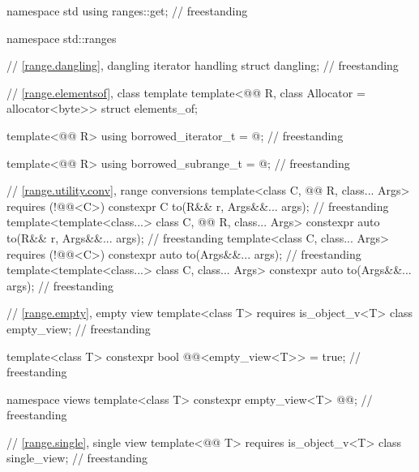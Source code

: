 \begin{codeblock}
namespace std {
  using ranges::get;                                                                // freestanding
}

namespace std::ranges {
  // \ref{range.dangling}, dangling iterator handling
  struct dangling;                                                                  // freestanding

  // \ref{range.elementsof}, class template 
  template<@@ R, class Allocator = allocator<byte>>
    struct elements_of;

  template<@@ R>
    using borrowed_iterator_t = @\seebelow@;                                          // freestanding

  template<@@ R>
    using borrowed_subrange_t = @\seebelow@;                                          // freestanding

  // \ref{range.utility.conv}, range conversions
  template<class C, @@ R, class... Args> requires (!@@<C>)
    constexpr C to(R&& r, Args&&... args);                                          // freestanding
  template<template<class...> class C, @@ R, class... Args>
    constexpr auto to(R&& r, Args&&... args);                                       // freestanding
  template<class C, class... Args> requires (!@@<C>)
    constexpr auto to(Args&&... args);                                              // freestanding
  template<template<class...> class C, class... Args>
    constexpr auto to(Args&&... args);                                              // freestanding

  // \ref{range.empty}, empty view
  template<class T>
    requires is_object_v<T>
  class empty_view;                                                                 // freestanding

  template<class T>
    constexpr bool @@<empty_view<T>> = true;                     // freestanding

  namespace views {
    template<class T>
      constexpr empty_view<T> @@{};                                              // freestanding
  }

  // \ref{range.single}, single view
  template<@@ T>
    requires is_object_v<T>
  class single_view;                                                                // freestanding

}
\end{codeblock}
